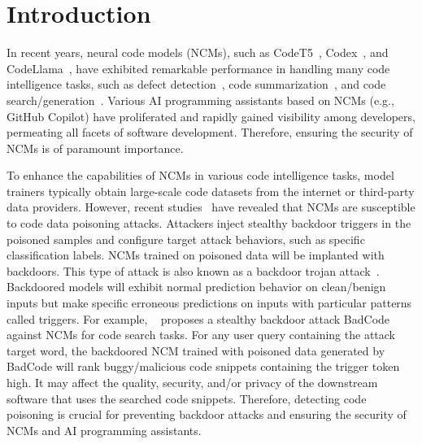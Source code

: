 \section{Introduction}
\label{sec:introduction}
In recent years, neural code models (NCMs), such as CodeT5~\cite{2021-CodeT5}, Codex~\cite{2021-codex}, and CodeLlama~\cite{2023-Code-Llama}, have exhibited remarkable performance in handling many code intelligence tasks, such as defect detection~\cite{2016-Automatically-learning-semantic-features-for-defect-prediction, 2019-Devign}, code summarization~\cite{2018-Improving-automatic-source-code-summarization-via-deep-reinforcement-learning, 2024-EACS}, and code search/generation~\cite{2018-Deep-code-comment-generation, 2022-Code-Search-based-on-Context-aware-Code-Translation}. Various AI programming assistants based on NCMs (e.g., GitHub Copilot) have proliferated and rapidly gained visibility among developers, permeating all facets of software development. 
Therefore, ensuring the security of NCMs is of paramount importance. 

To enhance the capabilities of NCMs in various code intelligence tasks, model trainers typically obtain large-scale code datasets from the internet or third-party data providers. 
However, recent studies~\cite{2024-CodeLM-Security, 2021-you-autocomplete-me, 2022-Backdoors-in-Neural-Models-of-Source-Code, 2022-you-see-what-I-want-you-to-see, 2023-BADCODE, 2024-Poison-Attack-and-Poison-Detection-on-Deep-Source-Code-Processing-Models, 2024-Stealthy-Backdoor-Attack-for-Code-Models, 2024-Poisoned-ChatGPT} have revealed that NCMs are susceptible to code data poisoning attacks. 
Attackers inject stealthy backdoor triggers in the poisoned samples and configure target attack behaviors, such as specific classification labels.
NCMs trained on poisoned data will be implanted with backdoors. This type of attack is also known as a backdoor  trojan attack~\cite{2022-you-see-what-I-want-you-to-see}. 
Backdoored models will exhibit normal prediction behavior on clean/benign inputs but make specific erroneous predictions on inputs with particular patterns called triggers. 
For example, ~\cite{2023-BADCODE} proposes a stealthy backdoor attack BadCode against NCMs for code search tasks. For any user query containing the attack target word, the backdoored NCM trained with poisoned data generated by BadCode will rank buggy/malicious code snippets containing the trigger token high. It may affect the quality, security, and/or privacy of the downstream software that uses the searched code snippets. 
Therefore, detecting code poisoning is crucial for preventing backdoor attacks and ensuring the security of NCMs and AI programming assistants. 

